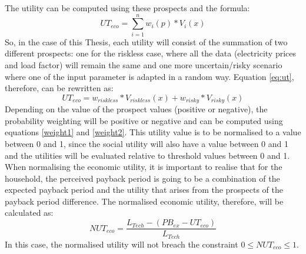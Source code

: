 \newline \newline \noindent
The utility can be computed using these prospects and the formula:
\begin{equation} \label{eq:ut}
    UT_{eco} = \sum_{i=1}^{n} w_{i}(p)*V_{i}(x)
\end{equation}
So, in the case of this Thesis, each utility will consist of the summation of two different prospects: one for the riskless case, where all the data (electricity prices and load factor) will remain the same and one more uncertain/risky scenario where one of the input parameter is adapted in a random way. Equation \ref{eq:ut}, therefore, can be rewritten as:
\begin{equation}
    UT_{eco} = w_{riskless}*V_{riskless}(x) + w_{risky}*V_{risky}(x)
\end{equation}
Depending on the value of the prospect values (positive or negative), the probability weighting will be positive or negative and can be computed using equations \ref{weight1} and \ref{weight2}. This utility value is to be normalised to a value between 0 and 1, since the social utility will also have a value between 0 and 1 and the utilities will be evaluated relative to threshold values between 0 and 1. When normalising the economic utility, it is important to realise that for the household, the perceived payback period is going to be a combination of the expected payback period and the utility that arises from the prospects of the payback period difference. The normalised economic utility, therefore, will be calculated as:
\begin{equation}
        NUT_{eco} = \frac{L_{Tech} - (PB_{ex} - UT_{eco})}{L_{Tech}}
\end{equation}
In this case, the normalised utility will not breach the constraint $0 \leq NUT_{eco} \leq 1$. 
